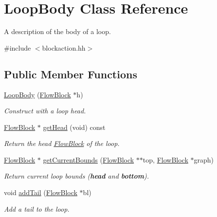 \hypertarget{class_loop_body}{}\section{Loop\+Body Class Reference}
\label{class_loop_body}


A description of the body of a loop.  




{\ttfamily \#include $<$blockaction.\+hh$>$}

\subsection*{Public Member Functions}
\begin{DoxyCompactItemize}
\item 
\mbox{\hyperlink{class_loop_body_a749b658f0979cb0c5d8e6ab17bdf416f}{Loop\+Body}} (\mbox{\hyperlink{class_flow_block}{Flow\+Block}} $\ast$h)
\begin{DoxyCompactList}\small\item\em Construct with a loop head. \end{DoxyCompactList}\item 
\mbox{\hyperlink{class_flow_block}{Flow\+Block}} $\ast$ \mbox{\hyperlink{class_loop_body_a7536eb29312af5840425ad08c34e03b7}{get\+Head}} (void) const
\begin{DoxyCompactList}\small\item\em Return the head \mbox{\hyperlink{class_flow_block}{Flow\+Block}} of the loop. \end{DoxyCompactList}\item 
\mbox{\hyperlink{class_flow_block}{Flow\+Block}} $\ast$ \mbox{\hyperlink{class_loop_body_a5c34d8675c1290e7b3ad25d602f6d52e}{get\+Current\+Bounds}} (\mbox{\hyperlink{class_flow_block}{Flow\+Block}} $\ast$$\ast$top, \mbox{\hyperlink{class_flow_block}{Flow\+Block}} $\ast$graph)
\begin{DoxyCompactList}\small\item\em Return current loop bounds ({\bfseries{head}} and {\bfseries{bottom}}). \end{DoxyCompactList}\item 
void \mbox{\hyperlink{class_loop_body_a6f9865236680edf3495208859639ce03}{add\+Tail}} (\mbox{\hyperlink{class_flow_block}{Flow\+Block}} $\ast$bl)
\begin{DoxyCompactList}\small\item\em Add a {\itshape tail} to the loop. \end{DoxyCompactList}\item 
$$
\end{DoxyCompactItemize}
